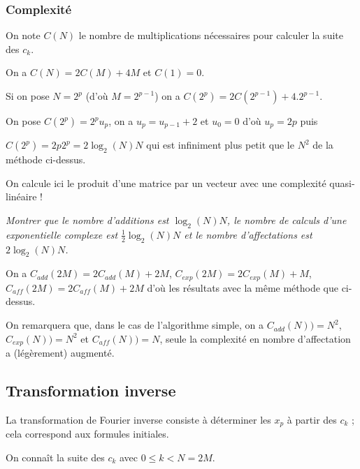 \subsubsection{Complexité}
On note $C(N)$ le nombre de multiplications nécessaires pour calculer la suite des $c_k$.

On a $C(N) = 2 C(M)+ 4 M$ et $C(1) = 0$.

Si on pose $N=2^p$ (d'où $M = 2^{p-1}$) on a $C(2^p) = 2C(2^{p-1})+4.2^{p-1}$.

On pose $C(2^p) = 2^p u_p$, on a $u_p=u_{p-1}+2$ et $u_0=0$ d'où $u_p=2p$ puis

$C(2^p)=2p2^p = 2\log_2(N)N$ qui est infiniment plus petit que le $N^2$ de la méthode ci-dessus.

\medskip

On calcule ici le produit d'une matrice par un vecteur avec une complexité quasi-linéaire !
\begin{Exercise}\it Montrer que le nombre d'additions est $\log_2(N)N$, le nombre de calculs d'une exponentielle complexe est $\frac 12\log_2(N)N$ et le nombre d'affectations est $2\log_2(N)N$.
\end{Exercise}
\begin{Answer} 
On a $C_{add}(2M) = 2C_{add}(M)+2M$, $C_{exp}(2M) = 2C_{exp}(M)+M$, $C_{aff}(2M) = 2C_{aff}(M)+2M$ d'où les résultats avec la même méthode que ci-dessus.

On remarquera que, dans le cas de l'algorithme simple, on a $C_{add}(N)) = N^2$, $C_{exp}(N)) = N^2$ et $C_{aff}(N)) = N$, seule la complexité en nombre d'affectation a (légèrement) augmenté.
\end{Answer}
\subsection{Transformation inverse}\label{iTFR} 
La transformation de Fourier inverse consiste à déterminer les $x_p$ à partir des $c_k$ ; cela correspond aux formules initiales.

On connaît la suite des $c_k$ avec $0 \le k < N=2M$.

